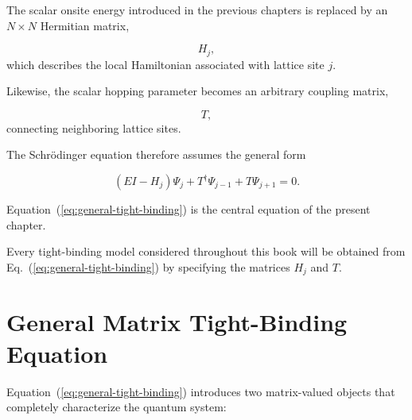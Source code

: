 The scalar onsite energy introduced in the previous chapters is replaced
by an $N\times N$ Hermitian matrix,

\[
	H_j,
\]
which describes the local Hamiltonian associated with lattice site $j$.

Likewise, the scalar hopping parameter becomes an arbitrary coupling
matrix,

\[
	T,
\]
connecting neighboring lattice sites.

The Schrödinger equation therefore assumes the general form

\begin{equation}
	(EI-H_j)\Psi_j
	+
	T^\dagger\Psi_{j-1}
	+
	T\Psi_{j+1}
	=
	0.
	\label{eq:general-tight-binding}
\end{equation}

Equation~(\ref{eq:general-tight-binding}) is the central equation of the
present chapter.

Every tight-binding model considered throughout this book will be
obtained from Eq.~(\ref{eq:general-tight-binding}) by specifying the
matrices $H_j$ and $T$.


\begin{center}
\end{center}



\section{General Matrix Tight-Binding Equation}

Equation~(\ref{eq:general-tight-binding}) introduces two matrix-valued
objects that completely characterize the quantum system:

